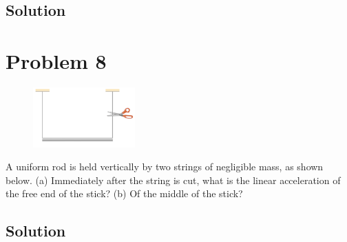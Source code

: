 \documentclass[12pt]{article}
\begin{document}
\subsection{Solution}


\pagebreak
\section{Problem 8}
\begin{figure}
    \vspace{-30pt}
    \includegraphics[width=0.35\textwidth]{graph_8.png} 
\end{figure}
A uniform rod is held vertically by two strings of negligible mass, as shown below. (a) Immediately after the string is cut, what is the linear acceleration of the free end of the stick? (b) Of the middle of the stick?

\subsection{Solution}
\end{document}
